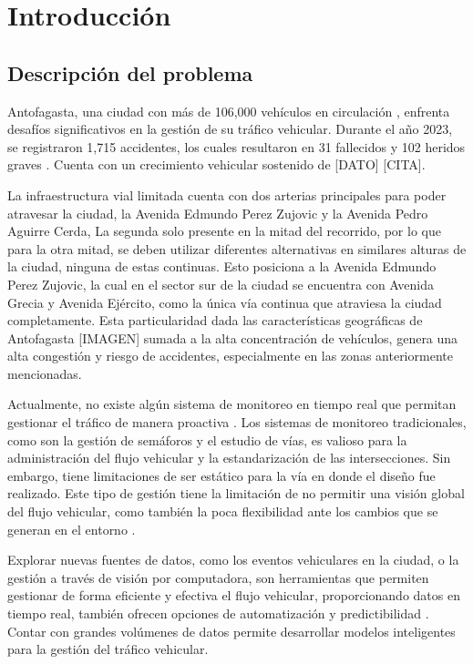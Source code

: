 \documentclass[12pt]{article}
\begin{document}
\section{Introducción}
\subsection{Descripción del problema}

Antofagasta, una ciudad con más de 106,000 vehículos en circulación \citep{comision2023}, enfrenta desafíos significativos en la gestión de su tráfico vehicular. Durante el año 2023, se registraron 1,715 accidentes, los cuales resultaron en 31 fallecidos y 102 heridos graves \citep{comision2023}. Cuenta con un crecimiento vehicular sostenido de [DATO] [CITA].

La infraestructura vial limitada cuenta con dos arterias principales para poder atravesar la ciudad, la Avenida Edmundo Perez Zujovic y la Avenida Pedro Aguirre Cerda, La segunda solo presente en la mitad del recorrido, por lo que para la otra mitad, se deben utilizar diferentes alternativas en similares alturas de la ciudad, ninguna de estas continuas. Esto posiciona a la Avenida Edmundo Perez Zujovic, la cual en el sector sur de la ciudad se encuentra con Avenida Grecia y Avenida Ejército, como la única vía continua que atraviesa la ciudad completamente. Esta particularidad dada las características geográficas de Antofagasta [IMAGEN] sumada a la alta concentración de vehículos, genera una alta congestión y  riesgo de accidentes, especialmente en las zonas anteriormente mencionadas.

Actualmente, no existe algún sistema de monitoreo en tiempo real que permitan gestionar el tráfico de manera proactiva \citep{goodall2019}. Los sistemas de monitoreo tradicionales, como son la gestión de semáforos y el estudio de vías, es valioso para la administración del flujo vehicular y la estandarización de las intersecciones. Sin embargo, tiene limitaciones de ser estático para la vía en donde el diseño fue realizado. Este tipo de gestión tiene la limitación de no permitir una visión global del flujo vehicular, como también la poca flexibilidad ante los cambios que se generan en el entorno \citep{auld2009}.

Explorar nuevas fuentes de datos, como los eventos vehiculares en la ciudad, o la gestión a través de visión por computadora, son herramientas que permiten gestionar de forma eficiente y efectiva el flujo vehicular, proporcionando datos en tiempo real, también ofrecen opciones de automatización y predictibilidad \citep{chen2015}. Contar con grandes volúmenes de datos permite desarrollar modelos inteligentes para la gestión del tráfico vehicular.
\end{document}
